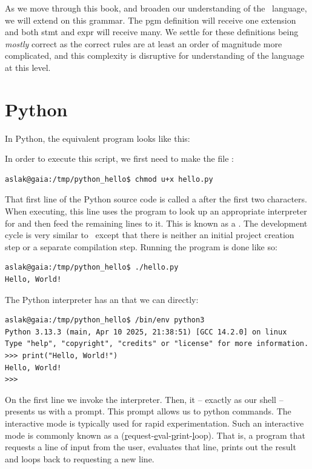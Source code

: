 As we move through this book, and broaden our understanding of the \csharp\ language, we will extend on this grammar. The pgm definition will receive one extension and both stmt and expr will receive many. We settle for these definitions being \textsl{mostly} correct as the correct rules are at least an order of magnitude more complicated, and this complexity is disruptive for understanding of the language at this level.

\section{Python}
\label{sec:first:python}

In Python, the equivalent program looks like this:


In order to execute this script, we first need to make the file :
\begin{verbatim}
aslak@gaia:/tmp/python_hello$ chmod u+x hello.py
\end{verbatim}

That first line of the Python source code is called a  after the first two characters. When executing, this line uses the  program to look up an appropriate interpreter for  and then feed the remaining lines to it. This is known as a . The development cycle is very similar to \csharp\ except that there is neither an initial project creation step or a separate compilation step. Running the program is done like so:

\begin{verbatim}
aslak@gaia:/tmp/python_hello$ ./hello.py
Hello, World!
\end{verbatim}

The Python interpreter has an  that we can  directly:

\begin{verbatim}
aslak@gaia:/tmp/python_hello$ /bin/env python3
Python 3.13.3 (main, Apr 10 2025, 21:38:51) [GCC 14.2.0] on linux
Type "help", "copyright", "credits" or "license" for more information.
>>> print("Hello, World!")
Hello, World!
>>> 
\end{verbatim}

On the first line we invoke the interpreter. Then, it -- exactly as our shell -- presents us with a prompt. This prompt allows us to  python commands. The interactive mode is typically used for rapid experimentation. Such an interactive mode is commonly known as a  (\underline{r}equest-\underline{e}val-\underline{p}rint-\underline{l}oop). That is, a program that requests a line of input from the user, evaluates that line, prints out the result and loops back to requesting a new line.

